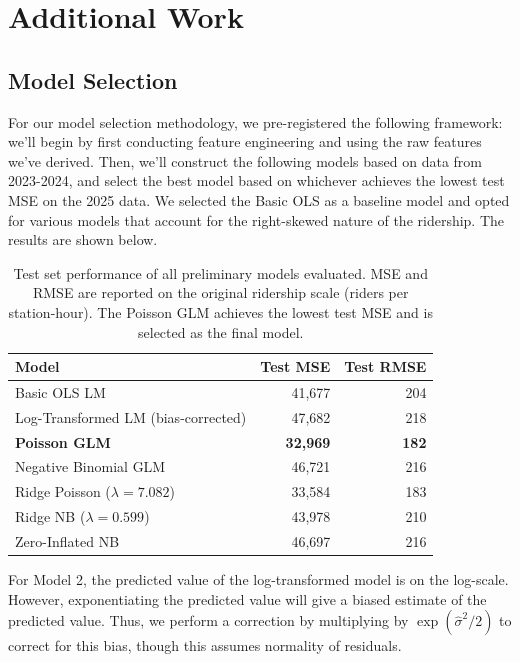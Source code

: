 \documentclass[11pt, letterpaper]{article}
\begin{document}
\newpage

\section{Additional Work}
\label{sec:additional}

\subsection{Model Selection}

For our model selection methodology, we pre-registered the following framework: we'll begin by first conducting feature engineering and using the raw features we've derived. Then, we'll construct the following models based on data from 2023-2024, and select the best model based on whichever achieves the lowest test MSE on the 2025 data. We selected the Basic OLS as a baseline model and opted for various models that account for the right-skewed nature of the ridership. The results are shown below.

\begin{table}[h]
\centering
\begin{tabular}{lrr}
\hline
\textbf{Model} & \textbf{Test MSE} & \textbf{Test RMSE} \\
\hline
Basic OLS LM                             & 41{,}677 & 204 \\
Log-Transformed LM (bias-corrected) & 47{,}682 & 218 \\
\textbf{Poisson GLM}                          & \textbf{32{,}969} & \textbf{182} \\
Negative Binomial GLM                & 46{,}721 & 216 \\
Ridge Poisson ($\lambda = 7.082$)    & 33{,}584 & 183 \\
Ridge NB ($\lambda = 0.599$)         & 43{,}978 & 210 \\
Zero-Inflated NB                     & 46{,}697 & 216 \\
\hline
\end{tabular}
\caption{Test set performance of all preliminary models evaluated. MSE and RMSE are reported on the original ridership scale (riders per station-hour). The Poisson GLM achieves the lowest test MSE and is selected as the final model.}
\label{tab:model_comparison}
\end{table}

For Model 2, the predicted value of the log-transformed model is on the log-scale. However, exponentiating the predicted value will give a biased estimate of the predicted value. Thus, we perform a correction by multiplying by $\exp(\hat{\sigma}^2/2)$ to correct for this bias, though this assumes normality of residuals.
\end{document}
